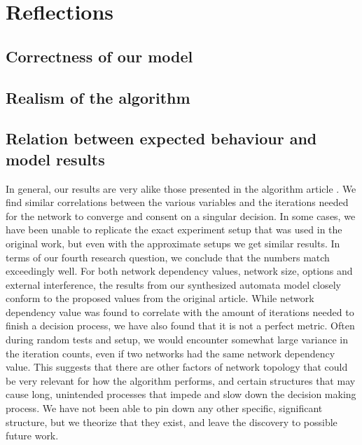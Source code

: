 \section{Reflections}

\subsection{Correctness of our model}
\subsection{Realism of the algorithm}
\subsection{Relation between expected behaviour and model results}
In general, our results are very alike those presented in the algorithm article \parencite{AlgorithmPaper}. We find similar correlations between the various variables and the iterations needed for the network to converge and consent on a singular decision. In some cases, we have been unable to replicate the exact experiment setup that was used in the original work, but even with the approximate setups we get similar results. In terms of our fourth research question, we conclude that the numbers match exceedingly well. For both network dependency values, network size, options and external interference, the results from our synthesized automata model closely conform to the proposed values from the original article.
While network dependency value was found to correlate with the amount of iterations needed to finish a decision process, we have also found that it is not a perfect metric. Often during random tests and setup, we would encounter somewhat large variance in the iteration counts, even if two networks had the same network dependency value. This suggests that there are other factors of network topology that could be very relevant for how the algorithm performs, and certain structures that may cause long, unintended processes that impede and slow down the decision making process. We have not been able to pin down any other specific, significant structure, but we theorize that they exist, and leave the discovery to possible future work.
